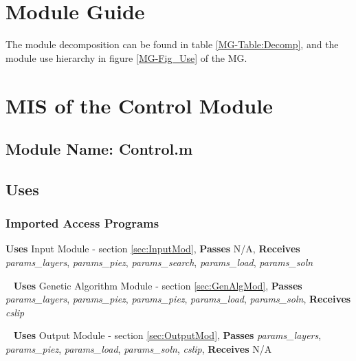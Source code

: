 \documentclass[12pt]{article}
\begin{document}

\section{Module Guide}

The module decomposition can be found in table \ref{MG-Table:Decomp},
and the module use hierarchy in figure \ref{MG-Fig_Use} of the MG.


\section{MIS of the Control Module}

\subsection{Module Name: Control.m}

\subsection{Uses}

\subsubsection{Imported Access Programs}

\noindent
\textbf{Uses} Input Module - section \ref{sec:InputMod},
\textbf{Passes} N/A, \textbf{Receives} \textit{params\_layers},
\textit{params\_piez}, \textit{params\_search},
\textit{params\_load}, \textit{params\_soln}

~\newline\noindent
\textbf{Uses} Genetic Algorithm Module - section \ref{sec:GenAlgMod},
\textbf{Passes} \textit{params\_layers}, \textit{params\_piez},
\textit{params\_piez}, \textit{params\_load},
\textit{params\_soln}, \textbf{Receives} \textit{cslip}

~\newline\noindent
\textbf{Uses} Output Module - section \ref{sec:OutputMod},
\textbf{Passes} \textit{params\_layers}, \textit{params\_piez},
\textit{params\_load}, \textit{params\_soln},
\textit{cslip}, \textbf{Receives} N/A
\end{document}
